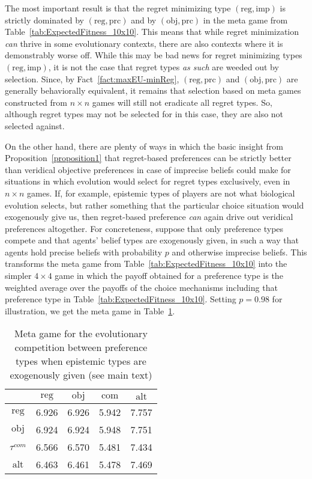 \documentclass[fleqn,reqno,11pt]{article}
\begin{document}
The most important result is that the regret minimizing type $(\text{reg}, \text{imp})$ is
strictly dominated by $(\text{reg}, \text{prc})$ and by $(\text{obj}, \text{prc})$ in the
meta game from Table~\ref{tab:ExpectedFitness_10x10}. This means that while regret minimization
\emph{can} thrive in some evolutionary contexts, there are also contexts where it is
demonstrably worse off. While this may be bad news for regret minimizing types
$(\text{reg}, \text{imp})$, it is not the case that regret types \emph{as such} are weeded out
by selection. Since, by Fact~\ref{fact:maxEU-minReg}, $(\text{reg}, \text{prc})$ and
$(\text{obj}, \text{prc})$ are generally behaviorally equivalent, it remains that selection
based on meta games constructed from $n \times n$ games will still not eradicate all regret
types. So, although regret types may not be selected for in this case, they are also not
selected against.

On the other hand, there are plenty of ways in which the basic insight from
Proposition~\ref{proposition1} that regret-based preferences can be strictly better than
veridical objective preferences in case of imprecise beliefs could make for situations in which
evolution would select for regret types exclusively, even in $n \times n$ games. If, for
example, epistemic types of players are not what biological evolution selects, but rather
something that the particular choice situation would exogenously give us, then regret-based
preference \emph{can} again drive out veridical preferences altogether. For concreteness,
suppose that only preference types compete and that agents' belief types are exogenously given,
in such a way that agents hold precise beliefs with probability $p$ and otherwise imprecise
beliefs. This transforms the meta game from Table~\ref{tab:ExpectedFitness_10x10} into the
simpler $4 \times 4$ game in which the payoff obtained for a preference type is the weighted
average over the payoffs of the choice mechanisms including that preference type in
Table~\ref{tab:ExpectedFitness_10x10}. Setting $p = 0.98$ for illustration, we get the meta
game in Table~\ref{tab:ExogeneousEpistemics}.

\begin{table}[]
\centering
\begin{tabular}{ccccc}
  \toprule
  & $\text{reg}$ 
  & $\text{obj}$ 
  & $\text{com}$
  & $\text{alt}$ \\ 
  \midrule
  $\text{reg} $ & 6.926 & 6.926 & 5.942 & 7.757 \\ 
  $\text{obj} $ & 6.924 & 6.924 & 5.948 & 7.751 \\ 
  $\tau^{com }$ & 6.566 & 6.570 & 5.481 & 7.434 \\ 
  $\text{alt} $ & 6.463 & 6.461 & 5.478 & 7.469 \\ 
   \bottomrule
\end{tabular}
\caption{Meta game for the evolutionary competition between preference types when epistemic types are exogenously
  given (see main text)}
\label{tab:ExogeneousEpistemics}
\end{table}
\end{document}
